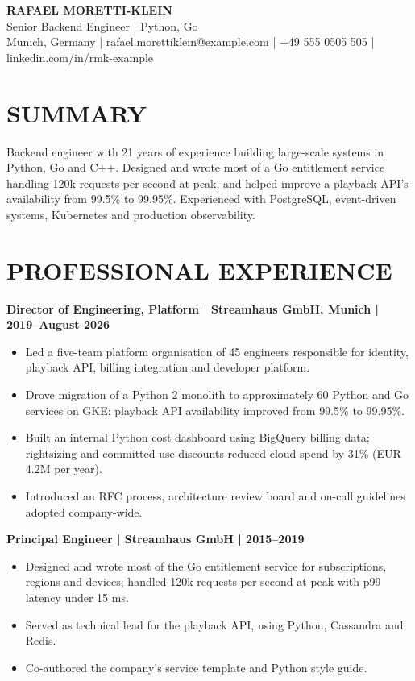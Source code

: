 \documentclass[11pt,a4paper]{article}
\begin{document}
\begin{center}
{\Huge\bfseries\color{primarycolor} RAFAEL MORETTI-KLEIN}\\[0.3em]
{\large\color{accentcolor} Senior Backend Engineer | Python, Go}\\[0.3em]
Munich, Germany | rafael.morettiklein@example.com | +49 555 0505 505 | linkedin.com/in/rmk-example
\end{center}

\section*{SUMMARY}
Backend engineer with 21 years of experience building large-scale systems in Python, Go and C++. Designed and wrote most of a Go entitlement service handling 120k requests per second at peak, and helped improve a playback API’s availability from 99.5\% to 99.95\%. Experienced with PostgreSQL, event-driven systems, Kubernetes and production observability.

\section*{PROFESSIONAL EXPERIENCE}
\textbf{Director of Engineering, Platform | Streamhaus GmbH, Munich | 2019–August 2026}
\begin{itemize}
\item Led a five-team platform organisation of 45 engineers responsible for identity, playback API, billing integration and developer platform.
\item Drove migration of a Python 2 monolith to approximately 60 Python and Go services on GKE; playback API availability improved from 99.5\% to 99.95\%.
\item Built an internal Python cost dashboard using BigQuery billing data; rightsizing and committed use discounts reduced cloud spend by 31\% (EUR 4.2M per year).
\item Introduced an RFC process, architecture review board and on-call guidelines adopted company-wide.
\end{itemize}

\textbf{Principal Engineer | Streamhaus GmbH | 2015–2019}
\begin{itemize}
\item Designed and wrote most of the Go entitlement service for subscriptions, regions and devices; handled 120k requests per second at peak with p99 latency under 15 ms.
\item Served as technical lead for the playback API, using Python, Cassandra and Redis.
\item Co-authored the company’s service template and Python style guide.
\end{itemize}
\end{document}
